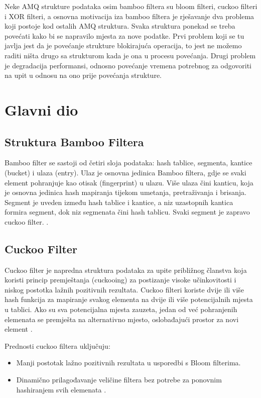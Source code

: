 \documentclass[seminarskirad]{fer}
\begin{document}
	Neke AMQ strukture podataka osim bamboo filtera su bloom filteri, cuckoo filteri i XOR filteri, a osnovna motivacija iza bamboo filtera je rješavanje dva problema koji postoje kod ostalih AMQ struktura. Svaka struktura ponekad se treba povećati kako bi se napravilo mjesta za nove podatke. Prvi problem koji se tu javlja jest da je povećanje strukture blokirajuća operacija, to jest ne možemo raditi ništa drugo sa strukturom kada je ona u procesu povećanja. Drugi problem je degradacija performansi, odnosno povećanje vremena potrebnog za odgovoriti na upit u odnosu na ono prije povećanja strukture.
	
	
	\chapter{Glavni dio}
	\label{pog:glavni_dio}
	
	\section{Struktura Bamboo Filtera}
	Bamboo filter se sastoji od četiri sloja podataka: hash tablice, segmenta, kantice (bucket) i ulaza (entry). Ulaz je osnovna jedinica Bamboo filtera, gdje se svaki element pohranjuje kao otisak (fingerprint) u ulazu. Više ulaza čini kanticu, koja je osnovna jedinica hash mapiranja tijekom umetanja, pretraživanja i brisanja. Segment je uveden između hash tablice i kantice, a niz uzastopnih kantica formira segment, dok niz segmenata čini hash tablicu. Svaki segment je zapravo cuckoo filter. \cite{wang2022bamboo}.
	
	\section{Cuckoo Filter}
	Cuckoo filter je napredna struktura podataka za upite približnog članstva koja koristi princip premještanja (cuckooing) za postizanje visoke učinkovitosti i niskog postotka lažnih pozitivnih rezultata. Cuckoo filteri koriste dvije ili više hash funkcija za mapiranje svakog elementa na dvije ili više potencijalnih mjesta u tablici. Ako su sva potencijalna mjesta zauzeta, jedan od već pohranjenih elemenata se premješta na alternativno mjesto, oslobađajući prostor za novi element \cite{fan2013cuckoo}.
	
	Prednosti cuckoo filtera uključuju:
	\begin{itemize}
		\item Manji postotak lažno pozitivnih rezultata u usporedbi s Bloom filterima.
		\item Dinamično prilagođavanje veličine filtera bez potrebe za ponovnim hashiranjem svih elemenata \cite{fan2014cuckoo}.
	\end{itemize}
	
\end{document}

